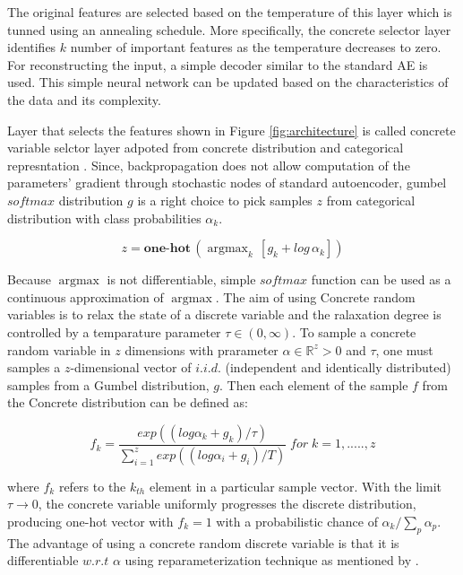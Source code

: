 \documentclass{bioinfo}
\newcommand{\R}{\mathbb{R}}
\DeclareMathOperator*{\argmax}{argmax}
\begin{document}
The original features are selected based on the temperature of this layer which is tunned using an annealing schedule. More specifically, the concrete selector layer identifies $k$ number of important features as the temperature decreases to zero. For reconstructing the input, a simple decoder similar to the standard AE is used. This simple neural network can be updated based on the characteristics of the data and its complexity.

Layer that selects the features shown in Figure \ref{fig:architecture} is called concrete variable selctor layer adpoted from concrete distribution  and categorical represntation \citep{jang2016categorical}. Since, backpropagation does not allow computation of the parameters' gradient through stochastic nodes of standard autoencoder, gumbel $softmax$ distribution $g$ \citep{gumbel1954statistical} is a right choice to pick samples $z$ from categorical distribution with class probabilities $\alpha_k$. 

\begin{equation}
	z = \textbf{one-hot} \, (\argmax_k \, [g_k + log \, \alpha_k])
\end{equation}

Because $\argmax$ is not differentiable, simple $softmax$ function can be used as a continuous approximation of $\argmax$. The aim of using Concrete random variables is to relax the state of a discrete variable and the ralaxation degree is controlled by a temparature parameter $\tau \in (0, \infty)$. To sample a concrete random variable in $z$ dimensions with prarameter $\alpha \in \R ^z>0$ and $\tau$, one must samples a $z$-dimensional vector of $i.i.d.$ (independent and identically distributed) samples from a Gumbel distribution, $g.$ Then each element of the sample $f$ from the Concrete distribution can be defined as:

\begin{equation}
    f_k = \frac{exp((log \alpha_k + g_k)/\tau)}{\sum_{i=1} ^z exp((log \alpha_i + g_i)/T) } \; for \; k = 1,.....,z
\end{equation}

where $f_k$ refers to the $k_{th}$ element in a particular sample
vector. With the limit $\tau \to 0$, the concrete variable uniformly progresses the discrete distribution, producing one-hot vector with $f_k = 1$ with a probabilistic chance of $\alpha _k/\sum_p \alpha _p$.
The advantage of using a concrete random discrete variable is that it is differentiable $w.r.t$ $\alpha$ using reparameterization technique as mentioned by \citep{kingma2013auto}.
\end{document}
